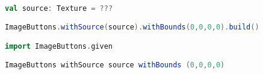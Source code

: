 \begin{lstlisting}[language=Scala, label=code:image-buttons-example, caption=Example of creating an ImageButton with given conversion enabled]

val source: Texture = ???

ImageButtons.withSource(source).withBounds(0,0,0,0).build()

import ImageButtons.given

ImageButtons withSource source withBounds (0,0,0,0)

\end{lstlisting}